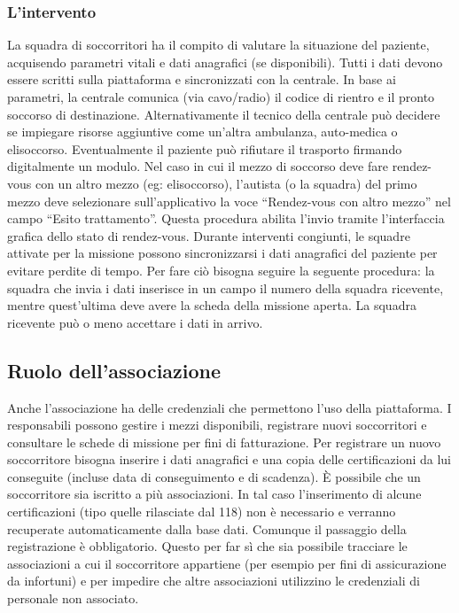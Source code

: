 \documentclass{article}
\begin{document}
    \subsubsection{L'intervento}
    La squadra di soccorritori ha il compito di valutare la situazione del paziente, acquisendo parametri vitali e dati anagrafici (se disponibili). Tutti i dati devono essere scritti sulla piattaforma e sincronizzati con la centrale. In base ai parametri, la centrale comunica (via cavo/radio) il codice di rientro e il pronto soccorso di destinazione. Alternativamente il tecnico della centrale può decidere se impiegare risorse aggiuntive come un’altra ambulanza, auto-medica o elisoccorso.
    Eventualmente il paziente può rifiutare il trasporto firmando digitalmente un modulo.
    Nel caso in cui il mezzo di soccorso deve fare rendez-vous con un altro mezzo (eg: elisoccorso), l’autista (o la squadra) del primo mezzo deve selezionare sull’applicativo la voce “Rendez-vous con altro mezzo” nel campo “Esito trattamento”. Questa procedura abilita l’invio tramite l’interfaccia grafica dello stato di rendez-vous.
    Durante interventi congiunti, le squadre attivate per la missione possono sincronizzarsi i dati anagrafici del paziente per evitare perdite di tempo. Per fare ciò bisogna seguire la seguente procedura: la squadra che invia i dati inserisce in un campo il numero della squadra ricevente, mentre quest’ultima deve avere la scheda della missione aperta. La squadra ricevente può o meno accettare i dati in arrivo.

    \subsection{Ruolo dell’associazione}
    Anche l’associazione ha delle credenziali che permettono l’uso della piattaforma. I responsabili possono gestire i mezzi disponibili, registrare nuovi soccorritori e consultare le schede di missione per fini di fatturazione.
    Per registrare un nuovo soccorritore bisogna inserire i dati anagrafici e una copia delle certificazioni da lui conseguite (incluse data di conseguimento e di scadenza).
    È possibile che un soccorritore sia iscritto a più associazioni. In tal caso l’inserimento di alcune certificazioni (tipo quelle rilasciate dal 118) non è necessario e verranno recuperate automaticamente dalla base dati.
    Comunque il passaggio della registrazione è obbligatorio. Questo per far sì che sia possibile tracciare le associazioni a cui il soccorritore appartiene (per esempio per fini di assicurazione da infortuni) e per impedire che altre associazioni utilizzino le credenziali di personale non associato.
\end{document}
